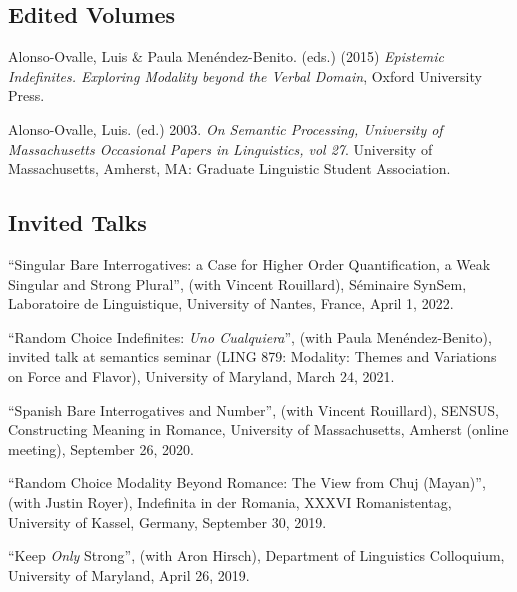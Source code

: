 \documentclass[11pt]{article}
\begin{document}

\subsection*{Edited Volumes}

Alonso-Ovalle, Luis \& Paula Men\'endez-Benito. (eds.) (2015) \emph{Epistemic Indefinites. Exploring Modality beyond the Verbal Domain}, Oxford University Press.

Alonso-Ovalle, Luis. (ed.) 2003. \emph{On Semantic Processing, University of Massachusetts Occasional Papers in Linguistics, vol 27}. University of Massachusetts, Amherst, MA: Graduate Linguistic Student Association.


\subsection*{Invited Talks}

``Singular Bare Interrogatives: a Case for Higher Order Quantification, a Weak Singular and Strong Plural'', (with Vincent Rouillard), S\'eminaire SynSem, Laboratoire de Linguistique, University of Nantes, France, April 1, 2022.

``Random Choice Indefinites: \textit{Uno Cualquiera}'', (with Paula Men\'endez-Benito), invited talk at semantics seminar (LING 879: Modality: Themes and Variations on Force and Flavor), University of Maryland, March 24, 2021.

``Spanish Bare Interrogatives and Number'', (with Vincent Rouillard), SENSUS, Constructing Meaning in Romance, University of Massachusetts, Amherst (online meeting), September 26, 2020.

``Random Choice Modality Beyond Romance: The View from Chuj (Mayan)'', (with Justin Royer), Indefinita in der Romania, XXXVI Romanistentag, University of Kassel, Germany, September 30, 2019.

``Keep \textit{Only} Strong'', (with Aron Hirsch), Department of Linguistics Colloquium, University of Maryland, April 26, 2019.
\end{document}
